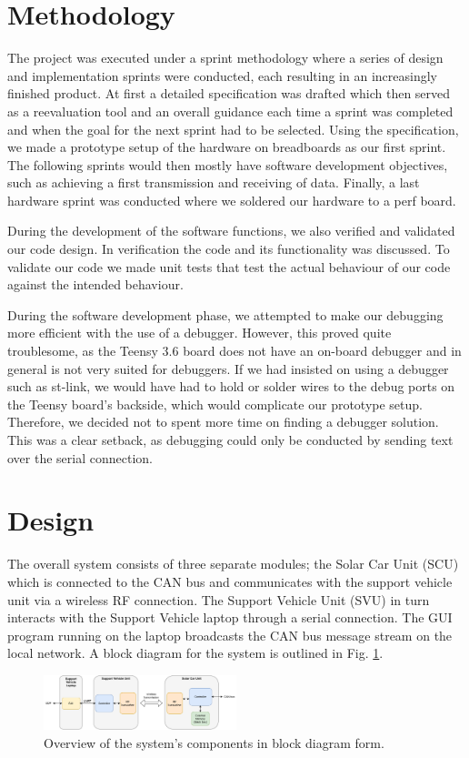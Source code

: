 \documentclass[conference]{IEEEtran}
\begin{document}
\section{Methodology}
The project was executed under a sprint methodology where a series of design and implementation sprints were conducted, each resulting in an increasingly finished product. At first a detailed specification was drafted which then served as a reevaluation tool and an overall guidance each time a sprint was completed and when the goal for the next sprint had to be selected. Using the specification, we made a prototype setup of the hardware on breadboards as our first sprint. The following sprints would then mostly have software development objectives, such as achieving a first transmission and receiving of data. Finally, a last hardware sprint was conducted where we soldered our hardware to a perf board.

During the development of the software functions, we also verified and validated our code design. In verification the code and its functionality was discussed. To validate our code we made unit tests that test the actual behaviour of our code against the intended behaviour.

During the software development phase, we attempted to make our debugging more efficient with the use of a debugger. However, this proved quite troublesome, as the Teensy 3.6 board does not have an on-board debugger and in general is not very suited for debuggers. If we had insisted on using a debugger such as st-link, we would have had to hold or solder wires to the debug ports on the Teensy board's backside, which would complicate our prototype setup. Therefore, we decided not to spent more time on finding a debugger solution. This was a clear setback, as debugging could only be conducted by sending text over the serial connection.

\section{Design}
The overall system consists of three separate modules; the Solar Car Unit (SCU) which is connected to the CAN bus and communicates with the support vehicle unit via a wireless RF connection. The Support Vehicle Unit (SVU) in turn interacts with the Support Vehicle laptop through a serial connection. The GUI program running on the laptop broadcasts the CAN bus message stream on the local network. A block diagram for the system is outlined in Fig. \ref{fig:schematic}. 
\begin{figure}[H]
    \centering
    \includegraphics[width=0.5\textwidth]{documentation/images/SystemSchematic.pdf}
    \caption{Overview of the system's components in block diagram form.}
    \label{fig:schematic}
\end{figure}
\end{document}
